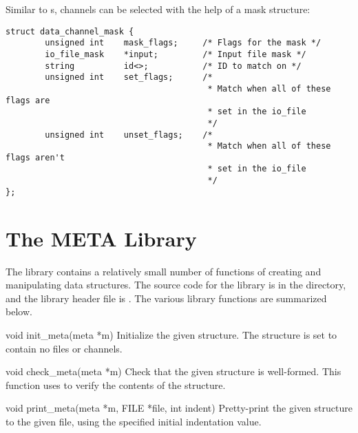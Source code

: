 Similar to s, channels can be selected with the help of a mask
structure:

\begin{verbatim}
struct data_channel_mask {
        unsigned int    mask_flags;     /* Flags for the mask */
        io_file_mask    *input;         /* Input file mask */
        string          id<>;           /* ID to match on */
        unsigned int    set_flags;      /*
                                         * Match when all of these flags are
                                         * set in the io_file
                                         */
        unsigned int    unset_flags;    /*
                                         * Match when all of these flags aren't
                                         * set in the io_file
                                         */
};
\end{verbatim}



\section{The META Library}
\label{sec:META:The META Library}

The \META{} library contains a relatively small number of functions of creating
and manipulating \META{} data structures.  The source code for the library is
in the  directory, and the library header file is
.  The various \META{} library functions are summarized
below.

\begin{cprototypelist}
  \item[void init_meta(meta *m)]
  Initialize the given  structure.  The structure is set to contain
  no files or channels.

  \item[void check_meta(meta *m)]
  Check that the given  structure is well-formed.  This function
  uses  to verify the contents of the structure.

  \item[void print_meta(meta *m, FILE *file, int indent)]
  Pretty-print the given  structure to the given file, using the
  specified initial indentation value.
\end{cprototypelist}


